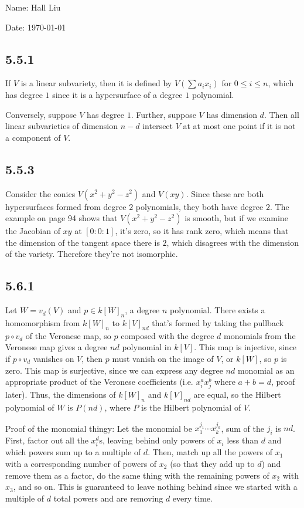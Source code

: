 \documentclass{article}
\begin{document}
Name: Hall Liu

Date: \today 
\vspace{1.5cm}
\subsection*{5.5.1}
If $V$ is a linear subvariety, then it is defined by $V(\sum a_ix_i)$ for $0\leq i\leq n$, which has degree $1$ since it is a hypersurface of a degree $1$ polynomial.

Conversely, suppose $V$ has degree $1$. Further, suppose $V$ has dimension $d$. Then all linear subvarieties of dimension $n-d$ intersect $V$ at at most one point if it is not a component of $V$. 
\subsection*{5.5.3}
Consider the conics $V(x^2+y^2-z^2)$ and $V(xy)$. Since these are both hypersurfaces formed from degree $2$ polynomials, they both have degree $2$. The example on page 94 shows that $V(x^2+y^2-z^2)$ is smooth, but if we examine the Jacobian of $xy$ at $[0:0:1]$, it's zero, so it has rank zero, which means that the dimension of the tangent space there is $2$, which disagrees with the dimension of the variety. Therefore they're not isomorphic.
\subsection*{5.6.1}
Let $W=v_d(V)$ and $p\in k[W]_n$, a degree $n$ polynomial. There exists a homomorphism from $k[W]_n$ to $k[V]_{nd}$ that's formed by taking the pullback $p\circ v_d$ of the Veronese map, so $p$ composed with the degree $d$ monomials from the Veronese map gives a degree $nd$ polynomial in $k[V]$. This map is injective, since if $p\circ v_d$ vanishes on $V$, then $p$ must vanish on the image of $V$, or $k[W]$, so $p$ is zero. This map is surjective, since we can express any degree $nd$ monomial as an appropriate product of the Veronese coefficients (i.e. $x_i^ax_j^b$ where $a+b=d$, proof later). Thus, the dimensions of $k[W]_n$ and $k[V]_{nd}$ are equal, so the Hilbert polynomial of $W$ is $P(nd)$, where $P$ is the Hilbert polynomial of $V$.

Proof of the monomial thingy: Let the monomial be $x_1^{j_1}\cdots x_k^{j_k}$, sum of the $j_i$ is $nd$. First, factor out all the $x_i^d$s, leaving behind only powers of $x_i$ less than $d$ and which powers sum up to a multiple of $d$. Then, match up all the powers of $x_1$ with a corresponding number of powers of $x_2$ (so that they add up to $d$) and remove them as a factor, do the same thing with the remaining powers of $x_2$ with $x_3$, and so on. This is guaranteed to leave nothing behind since we started with a multiple of $d$ total powers and are removing $d$ every time.
\end{document}
